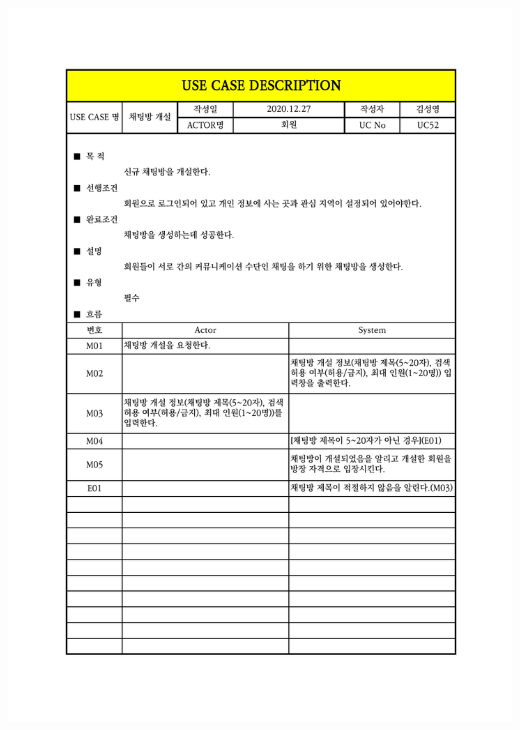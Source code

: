 {{{{{{{{{{{{{{{{{{{{{{{{{{{{{{{{{{{{{{{{{{{{{{{{{{{{{{{\includegraphics[width=1.1\textwidth]{./Figure/Design/Display/usecase/052.pdf} \\
}}}}}}}}}}}}}}}}}}}}}}}}}}}}}}}}}}}}}}}}}}}}}}}}}}}}}}}

